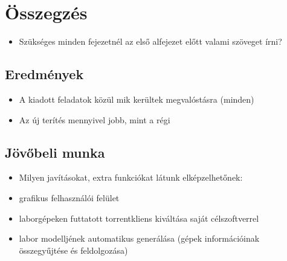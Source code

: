 \chapter{Összegzés}
\begin{itemize}
  \item Szükséges minden fejezetnél az első alfejezet előtt valami szöveget írni?
\end{itemize}
\section{Eredmények}
\begin{itemize}
  \item A kiadott feladatok közül mik kerültek megvalóstásra (minden)
  \item Az új terítés mennyivel jobb, mint a régi
\end{itemize}
\section{Jövőbeli munka}
\begin{itemize}
  \item Milyen javításokat, extra funkciókat látunk elképzelhetőnek:
  \item grafikus felhasználói felület
  \item laborgépeken futtatott torrentkliens kiváltása saját célszoftverrel
  \item labor modelljének automatikus generálása (gépek információinak összegyűjtése és feldolgozása)
\end{itemize}